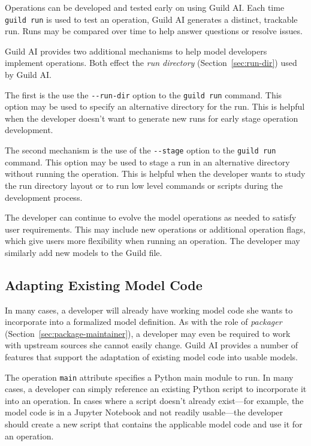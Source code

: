 \documentclass{article}
\begin{document}
Operations can be developed and tested early on using Guild AI. Each
time \verb|guild run| is used to test an operation, Guild AI generates
a distinct, trackable run. Runs may be compared over time to help
answer questions or resolve issues.

Guild AI provides two additional mechanisms to help model developers
implement operations. Both effect the \emph{run directory}
(Section~\ref{sec:run-dir}) used by Guild AI.

The first is the use the \verb|--run-dir| option
to the \verb|guild run| command. This option may be used to specify an
alternative directory for the run. This is helpful when the developer
doesn't want to generate new runs for early stage operation
development.

The second mechanism is the use of the \verb|--stage| option to the
\verb|guild run| command. This option may be used to stage a run in an
alternative directory without running the operation. This is helpful
when the developer wants to study the run directory layout or to run
low level commands or scripts during the development process.

The developer can continue to evolve the model operations as needed to
satisfy user requirements. This may include new operations or
additional operation flags, which give users more flexibility when
running an operation. The developer may similarly add new models to
the Guild file.

\subsection{Adapting Existing Model Code}

In many cases, a developer will already have working model code she
wants to incorporate into a formalized model definition. As with the
role of \emph{packager} (Section~\ref{sec:package-maintainer}), a
developer may even be required to work with upstream sources she
cannot easily change. Guild AI provides a number of features that
support the adaptation of existing model code into usable models.

The operation \verb|main| attribute specifies a Python main module to
run. In many cases, a developer can simply reference an existing
Python script to incorporate it into an operation. In cases where a
script doesn't already exist---for example, the model code is in a
Jupyter Notebook and not readily usable---the developer should create
a new script that contains the applicable model code and use it for an
operation.
\end{document}
